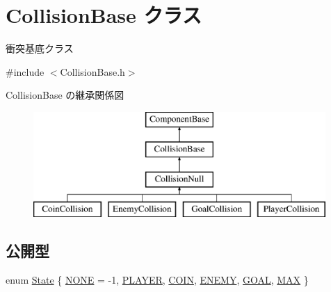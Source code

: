 \hypertarget{class_collision_base}{}\section{Collision\+Base クラス}
\label{class_collision_base}


衝突基底クラス  




{\ttfamily \#include $<$Collision\+Base.\+h$>$}

Collision\+Base の継承関係図\begin{figure}[H]
\begin{center}
\leavevmode
\includegraphics[height=4.000000cm]{class_collision_base}
\end{center}
\end{figure}
\subsection*{公開型}
\begin{DoxyCompactItemize}
\item 
enum \mbox{\hyperlink{class_collision_base_a4dd1ed00099a19c0176913af93c4e365}{State}} \{ \newline
\mbox{\hyperlink{class_collision_base_a4dd1ed00099a19c0176913af93c4e365a2682042c400780d05da0db180ef89526}{N\+O\+NE}} = -\/1, 
\mbox{\hyperlink{class_collision_base_a4dd1ed00099a19c0176913af93c4e365ae1aee076cb40136904a2300425bba493}{P\+L\+A\+Y\+ER}}, 
\mbox{\hyperlink{class_collision_base_a4dd1ed00099a19c0176913af93c4e365aeda009ba3599abbdb45a16ecaaf075e5}{C\+O\+IN}}, 
\mbox{\hyperlink{class_collision_base_a4dd1ed00099a19c0176913af93c4e365a90a5e8c5c8fa7a3ba38c80b583de37ce}{E\+N\+E\+MY}}, 
\newline
\mbox{\hyperlink{class_collision_base_a4dd1ed00099a19c0176913af93c4e365a82a11a1a3c44c82bd7909f48ed57fa62}{G\+O\+AL}}, 
\mbox{\hyperlink{class_collision_base_a4dd1ed00099a19c0176913af93c4e365aa7c59b2c2f20cbc76a01c38a1ebb6fea}{M\+AX}}
 \}
\end{DoxyCompactItemize}
